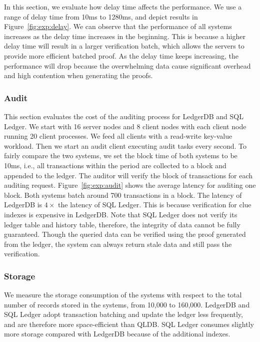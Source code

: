 \documentclass[11pt,dvipdfm]{article}
\begin{document}
In this section, we evaluate how delay time affects the performance. We use a range of delay time from 10ms to 1280ms, and depict results in Figure~\ref{fig:exp:delay}. We can observe that the performance of all systems increases as the delay time increases in the beginning. This is because a higher delay time will result in a larger verification batch, which allows the servers to provide more efficient batched proof. As the delay time keeps increasing, the performance will drop because the overwhelming data cause significant overhead and high contention when generating the proofs.

\subsubsection{Audit}

This section evaluates the cost of the auditing process for LedgerDB and SQL Ledger. We start with 16 server nodes and 8 client nodes with each client node running 20 client processes. We feed all clients with a read-write key-value workload. Then we start an audit client executing audit tasks every second.
To fairly compare the two systems, we set the block time of both systems to be 10ms, i.e., all transactions within the period are collected to a block and appended to the ledger. The auditor will verify the block of transactions for each auditing request.
Figure~\ref{fig:exp:audit} shows the average latency for auditing one block. Both systems batch around 700 transactions in a block. The latency of LedgerDB is $4\times$ the latency of SQL Ledger. This is because verification for clue indexes is expensive in LedgerDB. Note that SQL Ledger does not verify its ledger table and history table, therefore, the integrity of data cannot be fully guaranteed. Though the queried data can be verified using the proof generated from the ledger, the system can always return stale data and still pass the verification. 

\subsubsection{Storage}

We measure the storage consumption of the systems with respect to the total number of records stored in the systems, from 10,000 to 160,000. LedgerDB and SQL Ledger adopt transaction batching and update the ledger less frequently, and are therefore more space-efficient than QLDB. SQL Ledger consumes slightly more storage compared with LedgerDB because of the additional indexes.
\end{document}
